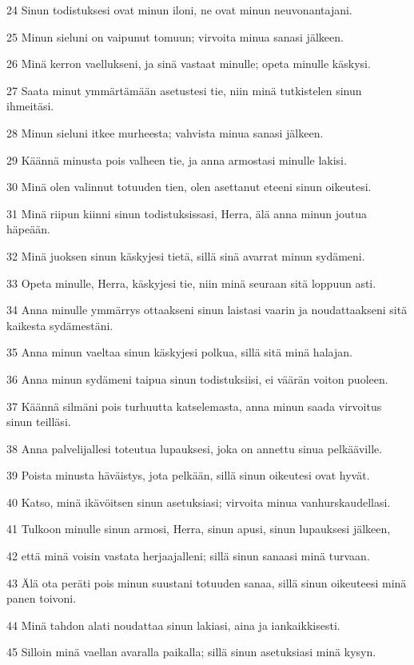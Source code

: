 \par 24 Sinun todistuksesi ovat minun iloni, ne ovat minun neuvonantajani.
\par 25 Minun sieluni on vaipunut tomuun; virvoita minua sanasi jälkeen.
\par 26 Minä kerron vaellukseni, ja sinä vastaat minulle; opeta minulle käskysi.
\par 27 Saata minut ymmärtämään asetustesi tie, niin minä tutkistelen sinun ihmeitäsi.
\par 28 Minun sieluni itkee murheesta; vahvista minua sanasi jälkeen.
\par 29 Käännä minusta pois valheen tie, ja anna armostasi minulle lakisi.
\par 30 Minä olen valinnut totuuden tien, olen asettanut eteeni sinun oikeutesi.
\par 31 Minä riipun kiinni sinun todistuksissasi, Herra, älä anna minun joutua häpeään.
\par 32 Minä juoksen sinun käskyjesi tietä, sillä sinä avarrat minun sydämeni.
\par 33 Opeta minulle, Herra, käskyjesi tie, niin minä seuraan sitä loppuun asti.
\par 34 Anna minulle ymmärrys ottaakseni sinun laistasi vaarin ja noudattaakseni sitä kaikesta sydämestäni.
\par 35 Anna minun vaeltaa sinun käskyjesi polkua, sillä sitä minä halajan.
\par 36 Anna minun sydämeni taipua sinun todistuksiisi, ei väärän voiton puoleen.
\par 37 Käännä silmäni pois turhuutta katselemasta, anna minun saada virvoitus sinun teilläsi.
\par 38 Anna palvelijallesi toteutua lupauksesi, joka on annettu sinua pelkääville.
\par 39 Poista minusta häväistys, jota pelkään, sillä sinun oikeutesi ovat hyvät.
\par 40 Katso, minä ikävöitsen sinun asetuksiasi; virvoita minua vanhurskaudellasi.
\par 41 Tulkoon minulle sinun armosi, Herra, sinun apusi, sinun lupauksesi jälkeen,
\par 42 että minä voisin vastata herjaajalleni; sillä sinun sanaasi minä turvaan.
\par 43 Älä ota peräti pois minun suustani totuuden sanaa, sillä sinun oikeuteesi minä panen toivoni.
\par 44 Minä tahdon alati noudattaa sinun lakiasi, aina ja iankaikkisesti.
\par 45 Silloin minä vaellan avaralla paikalla; sillä sinun asetuksiasi minä kysyn.
